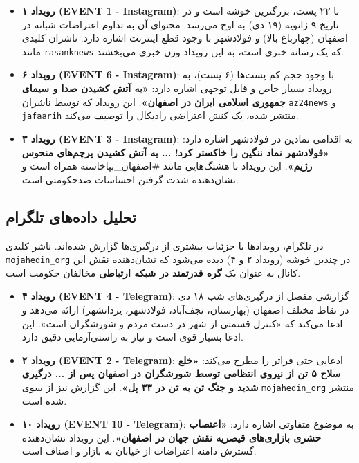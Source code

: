 \documentclass{article}
\begin{document}
	\begin{itemize}
		\item \textbf{رویداد ۱ (EVENT 1 - Instagram)}: با ۲۲ پست، بزرگترین خوشه است و در تاریخ ۹ ژانویه (۱۹ دی) به اوج می‌رسد. محتوای آن به تداوم اعتراضات شبانه در اصفهان (چهارباغ بالا) و فولادشهر با وجود قطع اینترنت اشاره دارد. ناشران کلیدی مانند \texttt{rasanknews} که یک رسانه خبری است، به این رویداد وزن خبری می‌بخشند.
		\item \textbf{رویداد ۶ (EVENT 6 - Instagram)}: با وجود حجم کم پست‌ها (۶ پست)، به رویداد بسیار خاص و قابل توجهی اشاره دارد: \textbf{«به آتش کشیدن صدا و سیمای جمهوری اسلامی ایران در اصفهان»}. این رویداد که توسط ناشران \texttt{az24news} و \texttt{jafaarih} منتشر شده، یک کنش اعتراضی رادیکال را توصیف می‌کند.
		\item \textbf{رویداد ۳ (EVENT 3 - Instagram)}: به اقدامی نمادین در فولادشهر اشاره دارد: \textbf{«فولادشهر نماد ننگین را خاکستر کرد! ... به آتش کشیدن پرچم‌های منحوس رژیم»}. این رویداد با هشتگ‌هایی مانند \#اصفهان\_بپاخاسته همراه است و نشان‌دهنده شدت گرفتن احساسات ضدحکومتی است.
	\end{itemize}
	
	\subsection{تحلیل داده‌های تلگرام}
	در تلگرام، رویدادها با جزئیات بیشتری از درگیری‌ها گزارش شده‌اند. ناشر کلیدی \texttt{mojahedin\_org} در چندین خوشه (رویداد ۲ و ۴) دیده می‌شود که نشان‌دهنده نقش این کانال به عنوان یک \textbf{گره قدرتمند در شبکه ارتباطی} مخالفان حکومت است.
	
	\begin{itemize}
		\item \textbf{رویداد ۴ (EVENT 4 - Telegram)}: گزارشی مفصل از درگیری‌های شب ۱۸ دی در نقاط مختلف اصفهان (بهارستان، نجف‌آباد، فولادشهر، یزدانشهر) ارائه می‌دهد و ادعا می‌کند که «کنترل قسمتی از شهر در دست مردم و شورشگران است». این ادعا بسیار قوی است و نیاز به راستی‌آزمایی دقیق دارد.
		\item \textbf{رویداد ۲ (EVENT 2 - Telegram)}: ادعایی حتی فراتر را مطرح می‌کند: \textbf{«خلع سلاح ۵ تن از نیروی انتظامی توسط شورشگران در اصفهان پس از ... درگیری شدید و جنگ تن به تن در ۳۳ پل»}. این گزارش نیز از سوی \texttt{mojahedin\_org} منتشر شده است.
		\item \textbf{رویداد ۱۰ (EVENT 10 - Telegram)}: به موضوع متفاوتی اشاره دارد: \textbf{«اعتصاب حشری بازاری‌های قیصریه نقش جهان در اصفهان»}. این رویداد نشان‌دهنده گسترش دامنه اعتراضات از خیابان به بازار و اصناف است.
	\end{itemize}
	
\end{document}
